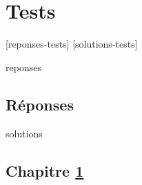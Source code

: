 \documentclass[letterpaper,11pt]{memoir}\usepackage[]{graphicx}\usepackage[]{color}
\newcounter{exercice}[chapter]
\begin{document}




\chapter{Tests}
\label{chap:tests}

[reponses-tests]
[solutions-tests]

\begin{Filesave}{reponses}
\bigskip
\section*{Réponses}

\end{Filesave}

\begin{Filesave}{solutions}
\section*{Chapitre \ref{chap:tests}}

\end{Filesave}




\end{document}
